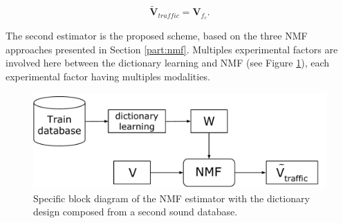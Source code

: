 \documentclass[twocolumn]{svjour3}          %
\providecommand{\DIFaddtex}[1]{{\protect\color{blue}\uwave{#1}}} %
\providecommand{\DIFaddbegin}{} %
\providecommand{\DIFaddend}{} %
\providecommand{\DIFadd}[1]{\texorpdfstring{\DIFaddtex{#1}}{#1}} %
\begin{document}
\begin{equation}\label{eq:v_tr_filtered}
\mathbf{\tilde{V}}_{traffic} = \mathbf{V}_{f_c}.
\end{equation}

The second estimator is the proposed scheme, based on \DIFaddbegin \DIFadd{one of }\DIFaddend the three NMF approaches presented in Section \ref{part:nmf}. Multiples experimental factors are involved here between the dictionary learning and NMF (see Figure \ref{fig:bloc_nmf}), each experimental factor having multiples modalities.
\begin{figure}
    \centering
    \includegraphics[width=\linewidth]{figures/bloc_diagram_NMF_EN_2.pdf}
    \caption{Specific block diagram of the NMF estimator with the dictionary design composed from a second sound database.}
    \label{fig:bloc_nmf}
\end{figure}
\end{document}
